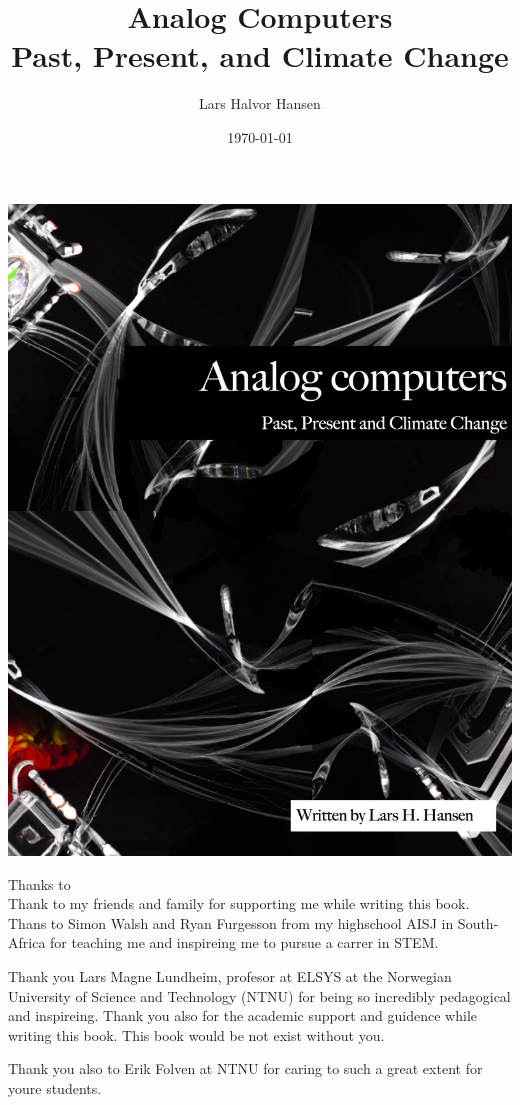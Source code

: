 \documentclass{report}
\title{Analog Computers \\ 
    \Large{Past, Present, and Climate Change}}
\author{Lars Halvor Hansen}
\date{\today}
\begin{document}
\includegraphics[scale=0.4]{ACPPCbookCover.jpg}
\pagestyle{classicbookstyle} %


\newpage
\maketitle
\tableofcontents
\newpage
\Large{Thanks to}\\
Thank to my friends and family for supporting me while writing this book. Thans to Simon Walsh and Ryan Furgesson from my highschool AISJ in South-Africa for teaching me and inspireing me to pursue a carrer in STEM. 

Thank you Lars Magne Lundheim, profesor at ELSYS at the Norwegian University of Science and Technology (NTNU) for being so incredibly pedagogical and inspireing. Thank you also for the academic support and guidence while writing this book. This book would be not exist without you. 

Thank you also to Erik Folven at NTNU for caring to such a great extent for youre students. 
\end{document}
